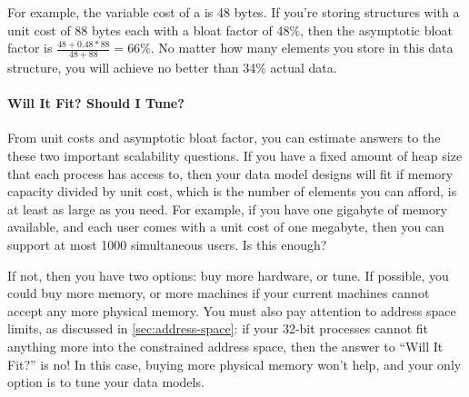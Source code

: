 For example, the variable cost of a  is 48 bytes. If you're
storing structures with a unit cost of 88 bytes each with a bloat factor of
48\%, then the asymptotic bloat factor is $\frac{48 + 0.48 * 88}{48 + 88} =
66\%$. No matter how many elements you store in this data structure, you will
achieve no better than 34\% actual data.


\paragraph{Will It Fit? Should I Tune?}

From unit costs and asymptotic bloat factor, you can estimate answers to the
these two important scalability questions. If you have a fixed amount of heap
size that each process has access to, then your data model designs will fit if
memory capacity divided by unit cost, which is the number of elements you can
afford, is at least as large as you need. For example, if you have one gigabyte
of memory available, and each user comes with a unit cost of one megabyte, then
you can support at most 1000 simultaneous users. Is this enough? 

\begin{figure}
\end{figure}

If not, then you have two options: buy more hardware, or tune. If possible, you
could buy more memory, or more machines if your current machines cannot accept
any more physical memory. You must also pay attention to address space limits,
as discussed in \autoref{sec:address-space}: if your 32-bit processes cannot fit
anything more into the constrained address space, then the answer to ``Will It
Fit?'' is no! In this case, buying more physical memory won't help, and your only
option is to tune your data models.

